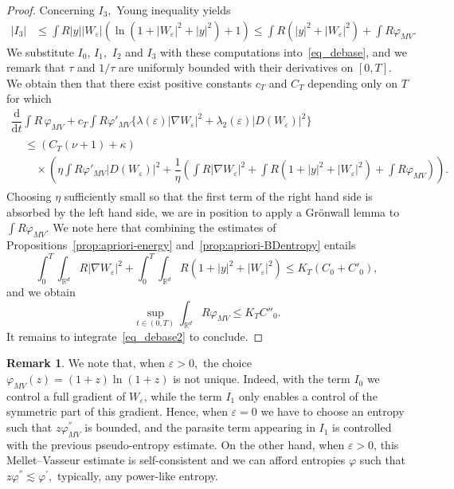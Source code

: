 \documentclass[11pt]{article}
\theoremstyle{definition}
\newtheorem{rema}[theo]{Remark}
\numberwithin{equation}{section}
\numberwithin{figure}{section}
\numberwithin{table}{section}
\newcommand*\R{\mathbb{R}}
\newcommand*\dd {\mathrm{d}}
\newcommand*\<{\left\langle}
\renewcommand*\>{\right\rangle}
\renewcommand*\le{\leqslant}
\newcommand*\eps{\varepsilon}
\begin{document}
\begin{proof}
Concerning $I_3,$ Young inequality yields
\begin{align*}
|I_3| & \le \int R |y| |W_\eps| \left(\ln\left(1+|W_\eps|^2 + |y|^2\right) + 1\right)
\le \int R \left(|y|^2 + |W_\eps|^2\right) + \int R \varphi_{MV}.
\end{align*}
We substitute $I_0$, $I_1,$ $I_2$ and $I_3$ with these computations into~\eqref{eq_debase}, and we remark that $\tau$ and $1/\tau$ are uniformly bounded with their derivatives on $[0,T].$ We obtain then that there exist positive constants $c_{T}$ and $C_T$ depending only on $T$ for which
\begin{multline}\label{eq_debase2}
\dfrac{\dd }{\dd t}\int R \, \varphi_{MV} + c_T \int R \varphi'_{MV} \{ \lambda(\eps) |\nabla W_\eps|^2 + \lambda_2(\eps) |D(W_\eps)|^2 \}\\
\begin{aligned}
&\le \left(C_T(\nu +1) + \kappa\right) \\
&\quad\times\!\left(\eta\!\int\! R \varphi'_{MV}|D(W_\eps)|^2 +
\dfrac{1}{\eta} \left(\int\! R|\nabla W_\eps|^2 + \int\! R(1+|y|^2 +|W_\eps|^2) + \int\! R \varphi_{MV} \right) \right)\!.
\end{aligned}
\end{multline}
Choosing $\eta$ sufficiently small so that the first term of the right hand side is absorbed by the left hand side, we are in position to apply a Gr\"onwall lemma to $\int R \varphi_{MV}.$ We note here that combining the estimates of Propositions~\ref{prop:apriori-energy} and~\ref{prop:apriori-BDentropy} entails
\[
\int_0^T \!\int_{\R^d} R |\nabla W_\eps|^2 + \int_0^T \! \int_{\R^d} R(1 +|y|^2 + |W_\eps|^2) \le K_T (C_0 + C'_0),
\]
and we obtain
\[
\sup_{t \in (0,T)} \int_{\R^d} R \varphi_{MV} \le K_T C''_0.
\]
It remains to integrate~\eqref{eq_debase2} to conclude.
\end{proof}

\begin{rema}
We note that, when $\varepsilon >0,$ the choice $\varphi_{MV}(z) = (1+z)\ln(1+z)$ is not unique. Indeed, with the term $I_0$ we control a full gradient of $W_{\varepsilon}$, while the term $I_1$ only enables a control of the symmetric part of this gradient. Hence, when $\varepsilon =0$ we have to choose an entropy such that $z
\varphi^{''}_{MV}$ is bounded, and the parasite term appearing in $I_1$ is controlled with the previous pseudo-entropy estimate. On the other hand, when $\varepsilon >0$, this Mellet--Vasseur estimate is self-consistent and we can afford entropies $\varphi$ such that $z \varphi^{''} \lesssim \varphi^{'},$ typically, any power-like entropy.
\end{rema}
\end{document}
